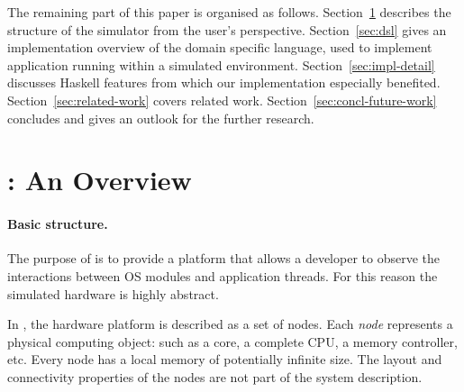 The remaining part of this paper is organised as follows.
Section~\ref{sec:soosim-an-overview} describes the structure of the \soosim simulator from the user's perspective.
Section~\ref{sec:dsl} gives an implementation overview of the domain specific language, used to implement application running within a \soosim simulated environment.
Section~\ref{sec:impl-detail} discusses Haskell features from which our implementation especially benefited.
Section~\ref{sec:related-work} covers related work.
Section~\ref{sec:concl-future-work} concludes and gives an outlook for the further research.

\section{\soosim: An Overview}
\label{sec:soosim-an-overview}

\paragraph{Basic structure.}
The purpose of \soosim is to provide a platform that allows a developer to observe the interactions between OS modules and application threads.
For this reason the simulated hardware is highly abstract.

In \soosim, the hardware platform is described as a set of nodes.
Each \emph{node} represents a physical computing object: such as a core, a complete CPU, a memory controller, etc.
Every node has a local memory of potentially infinite size.
The layout and connectivity properties of the nodes are not part of the system description.


